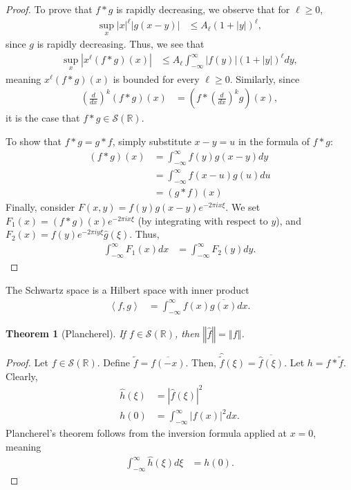 \documentclass[12pt]{extarticle}
\newcommand{\R}{\mathbb{R}}
\newcommand{\iprod}[2]{\left\langle #1,#2\right\rangle}
\newcommand{\norm}[1]{\left\Vert #1\right\Vert}
\theoremstyle{plain}
\newtheorem*{theorem}{Theorem}%
\theoremstyle{definition}
\theoremstyle{remark}
\renewcommand{\newline}{\hfill\break}
\begin{document}
  \begin{proof}
  To prove that $f\ast g$ is rapidly decreasing, we observe that for $\ell \geq 0$,
  \begin{align*}
    \sup_{x}|x|^{\ell}|g(x-y)| &\leq A_{\ell}(1+|y|)^{\ell},
  \end{align*}
  since $g$ is rapidly decreasing. Thus, we see that
  \begin{align*}
    \sup_{x}\left\vert x^{\ell}(f\ast g)(x) \right\vert &\leq A_{\ell}\int_{-\infty}^{\infty}|f(y)|\left(1 + |y|\right)^{\ell}dy,
  \end{align*}
  meaning $x^{\ell}(f\ast g)(x)$ is bounded for every $\ell \geq 0$. Similarly, since
  \begin{align*}
    \left(\frac{d}{dx}\right)^k \left(f\ast g\right)(x) &= \left(f\ast \left(\frac{d}{dx}\right)^{k}g\right)(x),
  \end{align*}
  it is the case that $f\ast g \in \mathcal{S}(\R)$. \newline

  To show that $f\ast g = g\ast f$, simply substitute $x - y = u$ in the formula of $f\ast g$:
  \begin{align*}
    \left(f\ast g\right)(x) &= \int_{-\infty}^{\infty}f(y)g(x-y)dy\\
               &= \int_{-\infty}^{\infty}f(x-u)g(u)du\\
               &= \left(g\ast f\right)(x)
  \end{align*}
  Finally, consider $F(x,y) = f(y)g(x-y)e^{-2\pi i x \xi}$. We set $F_1(x) = (f\ast g)(x)e^{-2\pi i x \xi}$ (by integrating with respect to $y$), and $F_2(x) = f(y)e^{-2\pi i y \xi}\hat{g}(\xi)$. Thus,
  \begin{align*}
    \int_{-\infty}^{\infty}F_1(x)dx &= \int_{-\infty}^{\infty}F_2(y)dy.
  \end{align*}
  \end{proof}
  The Schwartz space is a Hilbert space with inner product
  \begin{align*}
    \iprod{f}{g} &= \int_{-\infty}^{\infty}f(x)\overline{g(x)} dx.
  \end{align*}
  \begin{theorem}[Plancherel]
    If $f\in \mathcal{S}(\R)$, then $\norm{\hat{f}} = \norm{f}$.
  \end{theorem}
  \begin{proof}
    Let $f\in \mathcal{S}(\R)$. Define $\tilde{f} = \overline{f(-x)}$. Then, $\widehat{\tilde{f}}(\xi) = \overline{\hat{f}(\xi)}$. Let $h = f\ast \tilde{f}$. Clearly,
    \begin{align*}
      \hat{h}(\xi) &= \left\vert \hat{f}(\xi) \right\vert^2\\
      h(0) &= \int_{-\infty}^{\infty}|f(x)|^2dx.
    \end{align*}
    Plancherel's theorem follows from the inversion formula applied at $x=0$, meaning
    \begin{align*}
      \int_{-\infty}^{\infty}\hat{h}(\xi)d\xi &= h(0).
    \end{align*}
  \end{proof}
\end{document}
